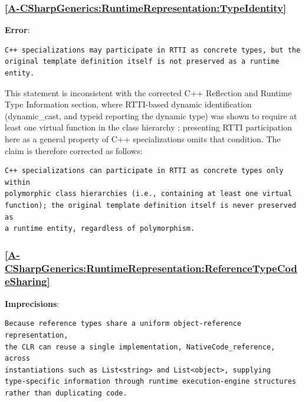 \documentclass[11pt]{report}
\begin{document}
\subsubsection*{\hyperref[A-CSharpGenerics:RuntimeRepresentation:TypeIdentity]{\ref*{A-CSharpGenerics:RuntimeRepresentation:TypeIdentity} }}
\noindent\textbf{Error}:

\begin{Verbatim}[breaklines=true]
C++ specializations may participate in RTTI as concrete types, but the
original template definition itself is not preserved as a runtime entity.
\end{Verbatim}

This statement is inconsistent with the corrected C++ Reflection and
Runtime Type Information section, where RTTI-based dynamic identification
(dynamic\_cast, and typeid reporting the dynamic type) was shown to require
at least one virtual function in the class hierarchy \cite{cppreference};
presenting RTTI participation here as a general property of C++
specializations omits that condition. The claim is therefore corrected as
follows:

\begin{Verbatim}[breaklines=true]
C++ specializations can participate in RTTI as concrete types only within
polymorphic class hierarchies (i.e., containing at least one virtual
function); the original template definition itself is never preserved as
a runtime entity, regardless of polymorphism.
\end{Verbatim}

\subsubsection*{\hyperref[A-CSharpGenerics:RuntimeRepresentation:ReferenceTypeCodeSharing]{\ref*{A-CSharpGenerics:RuntimeRepresentation:ReferenceTypeCodeSharing} }}
\noindent\textbf{Imprecisions}:
\begin{Verbatim}[breaklines=true]
Because reference types share a uniform object-reference representation,
the CLR can reuse a single implementation, NativeCode_reference, across
instantiations such as List<string> and List<object>, supplying
type-specific information through runtime execution-engine structures
rather than duplicating code.
\end{Verbatim}
\end{document}
